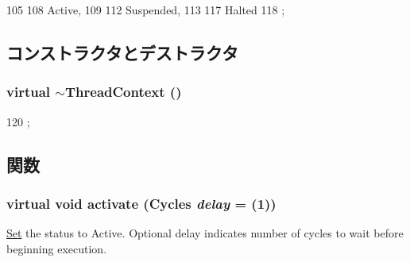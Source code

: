 \begin{DoxyCode}
105     {
108         Active,
109 
112         Suspended,
113 
117         Halted
118     };
\end{DoxyCode}


\subsection{コンストラクタとデストラクタ}
\hypertarget{classThreadContext_a23d9e505ac02c1e443ad89801260745e}{
\subsubsection[{$\sim$ThreadContext}]{\setlength{\rightskip}{0pt plus 5cm}virtual $\sim${\bf ThreadContext} ()}}
\label{classThreadContext_a23d9e505ac02c1e443ad89801260745e}



\begin{DoxyCode}
120 { };
\end{DoxyCode}


\subsection{関数}
\hypertarget{classThreadContext_a9270160e6cce25ded6999f6e4e60a3ed}{
\subsubsection[{activate}]{\setlength{\rightskip}{0pt plus 5cm}virtual void activate ({\bf Cycles} {\em delay} = {(1)})}}
\label{classThreadContext_a9270160e6cce25ded6999f6e4e60a3ed}
\hyperlink{classSet}{Set} the status to Active. Optional delay indicates number of cycles to wait before beginning execution. 

